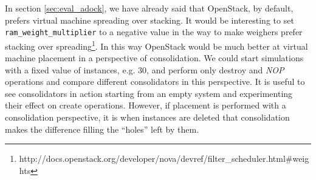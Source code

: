 In section \ref{sec:eval_adock}, we have already said that OpenStack, by default, prefers virtual machine spreading over stacking. It would be interesting to set \texttt{ram\_weight\_multiplier} to a negative value in the way to make weighers prefer stacking over spreading\footnote{http://docs.openstack.org/developer/nova/devref/filter\_scheduler.html\#weights}. In this way OpenStack would be much better at virtual machine placement in a perspective of consolidation. We could start simulations with a fixed value of instances, e.g. $30$, and perform only destroy and \textit{NOP} operations and compare different consolidators in this perspective. It is useful to see consolidators in action starting from an empty system and experimenting their effect on create operations. However, if placement is performed with a consolidation perspective, it is when instances are deleted that consolidation makes the difference filling the ``holes'' left by them.